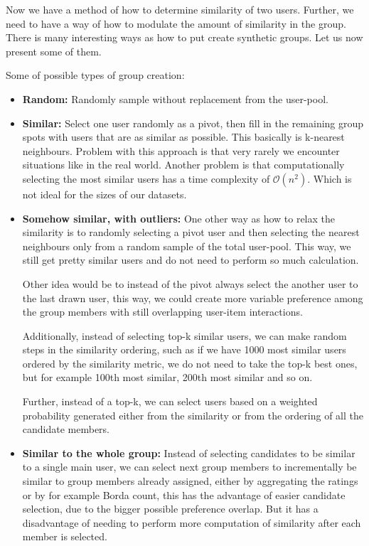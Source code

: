 Now we have a method of how to determine similarity of two users. Further, we need to have a way of how to modulate the amount of similarity in the group. There is many interesting ways as how to put create synthetic groups. Let us now present some of them.

Some of possible types of group creation:
\begin{itemize}
    \item \textbf{Random:}
        Randomly sample without replacement from the user-pool.
        
    \item \textbf{Similar:}
        Select one user randomly as a pivot, then fill in the remaining group spots with users that are as similar as possible. This basically is k-nearest neighbours. Problem with this approach is that very rarely we encounter situations like in the real world. Another problem is that computationally selecting the most similar users has a time complexity of $\mathcal{O}(n^2)$. Which is not ideal for the sizes of our datasets.
        
    \item \textbf{Somehow similar, with outliers:}
        One other way as how to relax the similarity is to randomly selecting a pivot user and then selecting the nearest neighbours only from a random sample of the total user-pool. This way, we still get pretty similar users and do not need to perform so much calculation.
        
        Other idea would be to instead of the pivot always select the another user to the last drawn user, this way, we could create more variable preference among the group members with still overlapping user-item interactions.
        
        Additionally, instead of selecting top-k similar users, we can make random steps in the similarity ordering, such as if we have 1000 most similar users ordered by the similarity metric, we do not need to take the top-k best ones, but for example 100th most similar, 200th most similar and so on.
        
        Further, instead of a top-k, we can select users based on a weighted probability generated either from the similarity or from the ordering of all the candidate members.
        
    \item \textbf{Similar to the whole group:}
        Instead of selecting candidates to be similar to a single main user, we can select next group members to incrementally be similar to group members already assigned, either by aggregating the ratings or by for example Borda count, this has the advantage of easier candidate selection, due to the bigger possible preference overlap. But it has a disadvantage of needing to perform more computation of similarity after each member is selected.
        

\end{itemize}
